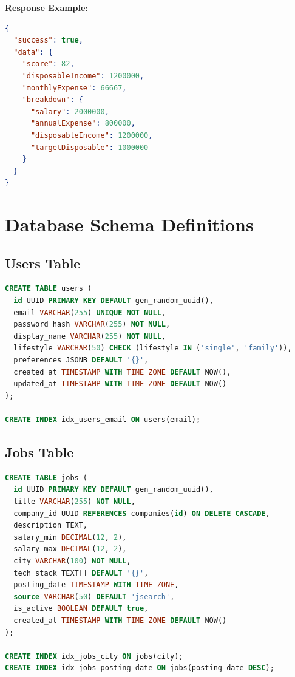 \textbf{Response Example}:
\begin{lstlisting}[language=json]
{
  "success": true,
  "data": {
    "score": 82,
    "disposableIncome": 1200000,
    "monthlyExpense": 66667,
    "breakdown": {
      "salary": 2000000,
      "annualExpense": 800000,
      "disposableIncome": 1200000,
      "targetDisposable": 1000000
    }
  }
}
\end{lstlisting}

\chapter{Database Schema Definitions}

\section{Users Table}

\begin{lstlisting}[language=sql]
CREATE TABLE users (
  id UUID PRIMARY KEY DEFAULT gen_random_uuid(),
  email VARCHAR(255) UNIQUE NOT NULL,
  password_hash VARCHAR(255) NOT NULL,
  display_name VARCHAR(255) NOT NULL,
  lifestyle VARCHAR(50) CHECK (lifestyle IN ('single', 'family')),
  preferences JSONB DEFAULT '{}',
  created_at TIMESTAMP WITH TIME ZONE DEFAULT NOW(),
  updated_at TIMESTAMP WITH TIME ZONE DEFAULT NOW()
);

CREATE INDEX idx_users_email ON users(email);
\end{lstlisting}

\section{Jobs Table}

\begin{lstlisting}[language=sql]
CREATE TABLE jobs (
  id UUID PRIMARY KEY DEFAULT gen_random_uuid(),
  title VARCHAR(255) NOT NULL,
  company_id UUID REFERENCES companies(id) ON DELETE CASCADE,
  description TEXT,
  salary_min DECIMAL(12, 2),
  salary_max DECIMAL(12, 2),
  city VARCHAR(100) NOT NULL,
  tech_stack TEXT[] DEFAULT '{}',
  posting_date TIMESTAMP WITH TIME ZONE,
  source VARCHAR(50) DEFAULT 'jsearch',
  is_active BOOLEAN DEFAULT true,
  created_at TIMESTAMP WITH TIME ZONE DEFAULT NOW()
);

CREATE INDEX idx_jobs_city ON jobs(city);
CREATE INDEX idx_jobs_posting_date ON jobs(posting_date DESC);
\end{lstlisting}

